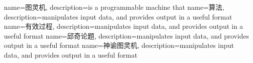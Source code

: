 {
  name=图灵机,
  description={is a programmable machine that}
}
{
  name=算法,
  description={manipulates input data, and provides output in a useful format}
}
{
  name=有效过程,
  description={manipulates input data, and provides output in a useful format}
}
{
  name=邱奇论题,
  description={manipulates input data, and provides output in a useful format}
}
{
  name=神谕图灵机,
  description={manipulates input data, and provides output in a useful format}
}

